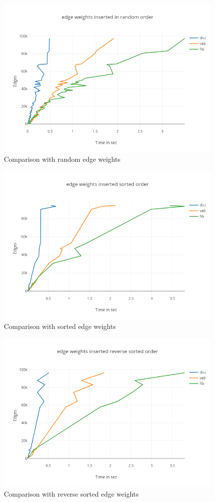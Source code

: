 \documentclass{article}
\begin{document}
\begin{figure}[h!]
\centering
\includegraphics[width=1\columnwidth]{random_data.png}
\caption{Comparison with random edge weights}
\label{fig:vb}
\end{figure}

\begin{figure}[h!]
\centering
\includegraphics[width=0.8\columnwidth]{sorted_data.png}
\caption{Comparison with sorted edge weights}
\label{fig:vb}
\end{figure}

\begin{figure}[h!]
\centering
\includegraphics[width=0.8\columnwidth]{rsorted_data.png}
\caption{Comparison with reverse sorted edge weights}
\label{fig:vb}
\end{figure}
\end{document}
